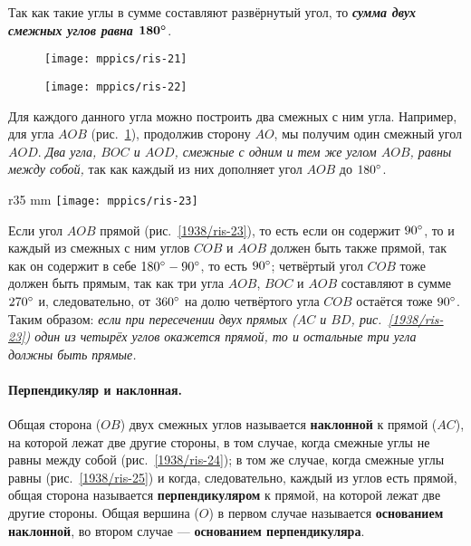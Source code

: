 Так как такие углы в сумме составляют развёрнутый угол, то \textbf{\emph{сумма двух смежных углов равна $\bm{180\degree}$}}.

\begin{figure}[h!]
\begin{minipage}{.48\textwidth}
\centering
\texttt{[image: mppics/ris-21]}
\end{minipage}\hfill
\begin{minipage}{.48\textwidth}
\centering
\texttt{[image: mppics/ris-22]}
\end{minipage}

\medskip

\begin{minipage}{.48\textwidth}
\centering
\caption{}\label{1938/ris-21}
\end{minipage}\hfill
\begin{minipage}{.48\textwidth}
\centering
\caption{}\label{1938/ris-22}
\end{minipage}
\vskip-4mm
\end{figure}

Для каждого данного угла можно построить два смежных с ним угла.
Например, для угла $AOB$ (рис.~\ref{1938/ris-22}), продолжив сторону $AO$, мы получим один смежный угол $AOD$.
\emph{Два угла, $BOC$ и $AOD$, смежные с одним и тем же углом $AOB$, равны между собой,} так как каждый из них дополняет угол $AOB$ до $180\degree$.

\begin{wrapfigure}{r}{35 mm}
\centering
\texttt{[image: mppics/ris-23]}
\caption{}\label{1938/ris-23}
\end{wrapfigure}

Если угол $AOB$ прямой (рис.~\ref{1938/ris-23}), то есть если он содержит $90\degree$, то и каждый из смежных с ним углов $COB$ и $AOB$ должен быть также прямой, так как он содержит в себе $180\degree-90\degree$, то есть $90\degree$;
четвёртый угол $COB$ тоже должен быть прямым, так как три угла $AOB$, $BOC$ и $AOB$ составляют в сумме $270\degree$ и, следовательно, от $360\degree$ на долю четвёртого угла $COB$ остаётся тоже $90\degree$.
Таким образом:
\emph{если при пересечении двух прямых \emph{($AC$ и $BD$, рис.~\ref{1938/ris-23})} один из четырёх углов окажется прямой, то и остальные три угла должны быть прямые.}

\paragraph{Перпендикуляр и наклонная.}\label{1938/23}
Общая сторона ($OB$) двух смежных углов называется \textbf{наклонной} к прямой ($AC$), на которой лежат две другие стороны, в том случае, когда смежные углы не равны между собой (рис.~\ref{1938/ris-24});
в том же случае, когда смежные углы равны (рис.~\ref{1938/ris-25}) и когда, следовательно, каждый из углов есть прямой, общая сторона называется \textbf{перпендикуляром} к прямой, на которой лежат две другие стороны.
Общая вершина ($O$) в первом случае называется \textbf{основанием наклонной}, во втором случае — \textbf{основанием перпендикуляра}.

